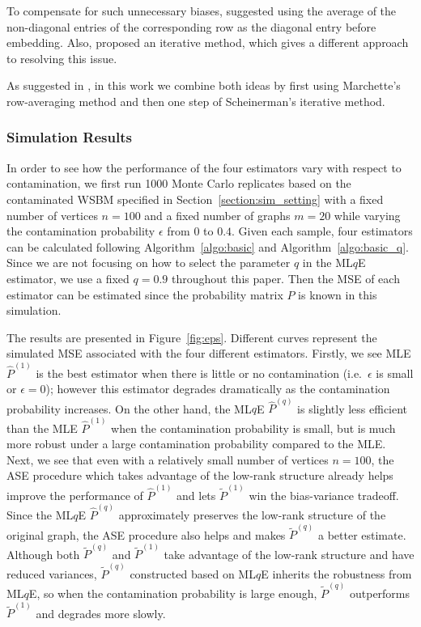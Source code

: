 \documentclass[a4paper]{article}
\renewcommand{\hat}{\widehat}
\begin{document}
To compensate for such unnecessary biases, \citet{marchette2011vertex} suggested using the average of the non-diagonal entries of the corresponding row as the diagonal entry before embedding. Also, \citet{scheinerman2010modeling} proposed an iterative method, which gives a different approach to resolving this issue.

As suggested in \citep{tang2016law}, in this work we combine both ideas by first using Marchette's row-averaging method and then one step of Scheinerman's iterative method.

\subsubsection{Simulation Results}

In order to see how the performance of the four estimators vary with respect to contamination, we first run 1000 Monte Carlo replicates based on the contaminated WSBM specified in Section~\ref{section:sim_setting} with a fixed number of vertices $n = 100$ and a fixed number of graphs $m = 20$ while varying the contamination probability $\epsilon$ from $0$ to $0.4$.
Given each sample, four estimators can be calculated following Algorithm~\ref{algo:basic} and Algorithm~\ref{algo:basic_q}. Since we are not focusing on how to select the parameter $q$ in the ML$q$E estimator, we use a fixed $q = 0.9$ throughout this paper. Then the MSE of each estimator can be estimated since the probability matrix $P$ is known in this simulation.

The results are presented in Figure~\ref{fig:eps}. Different curves represent the simulated MSE associated with the four different estimators.
Firstly, we see MLE $\hat{P}^{(1)}$ is the best estimator when there is little or no contamination (i.e.\ $\epsilon$ is small or $\epsilon = 0$); however this estimator degrades dramatically as the contamination probability increases. On the other hand, the ML$q$E $\hat{P}^{(q)}$ is slightly less efficient than the MLE $\hat{P}^{(1)}$ when the contamination probability is small, but is much more robust under a large contamination probability compared to the MLE.
Next, we see that even with a relatively small number of vertices $n = 100$, the ASE procedure which takes advantage of the low-rank structure already helps improve the performance of $\hat{P}^{(1)}$ and lets $\widetilde{P}^{(1)}$ win the bias-variance tradeoff. Since the ML$q$E $\hat{P}^{(q)}$ approximately preserves the low-rank structure of the original graph, the ASE procedure also helps and makes $\widetilde{P}^{(q)}$ a better estimate. Although both $\widetilde{P}^{(q)}$ and $\widetilde{P}^{(1)}$ take advantage of the low-rank structure and have reduced variances, $\widetilde{P}^{(q)}$ constructed based on ML$q$E inherits the robustness from ML$q$E, so when the contamination probability is large enough, $\widetilde{P}^{(q)}$ outperforms $\widetilde{P}^{(1)}$ and degrades more slowly.
\end{document}

